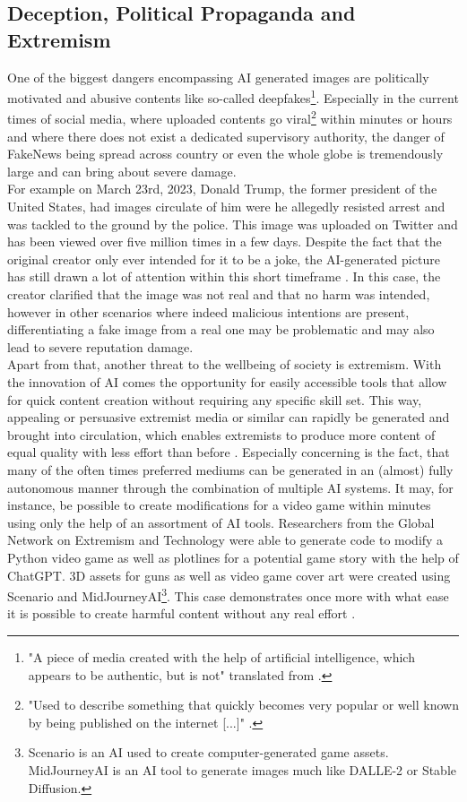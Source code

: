 \documentclass[10pt,twocolumn,twoside]{osajnl}
\begin{document}
\subsection{Deception, Political Propaganda and Extremism}
One of the biggest dangers encompassing AI generated images are politically motivated and abusive contents like so-called deepfakes\footnote[1]{"A piece of media created with the help of artificial intelligence, which appears to be authentic, but is not" translated from \cite{gabler}.}. 
Especially in the current times of social media, where uploaded contents go viral\footnote[2]{"Used to describe something that quickly becomes very popular or well known by being published on the internet [...]" \cite{viral}.} 
within minutes or hours and where there does not exist a dedicated supervisory authority, the danger of FakeNews being spread across country or even the whole globe is tremendously large and can bring about severe damage. \\ 
For example on March 23rd, 2023, Donald Trump, the former president of the United States, had images circulate of him 
were he allegedly resisted arrest and was tackled to the ground by the police. This image was uploaded on Twitter and has been viewed over five million times in a few days. Despite the fact that the original creator 
only ever intended for it to be a joke, the AI-generated picture has still drawn a lot of attention within this short timeframe \cite{trump}. In this case, the creator clarified that the image 
was not real and that no harm was intended, however in other scenarios where indeed malicious intentions are present, differentiating a fake image from a real one may be problematic and may also lead to severe reputation damage.
\\
Apart from that, another threat to the wellbeing of society is extremism. With the innovation of AI comes the opportunity for easily accessible tools that allow
for quick content creation without requiring any specific skill set. This way, appealing or persuasive extremist media or similar can rapidly be generated
and brought into circulation, which enables extremists to produce more content of equal quality with less effort than before \cite{AIPropaganda}.
Especially concerning is the fact, that many of the often times preferred mediums can be generated in an (almost) fully autonomous manner through the combination of multiple AI systems.
It may, for instance, be possible to create modifications for a video game within minutes using only the help of an assortment of AI tools.
Researchers from the Global Network on Extremism and Technology were able to generate code to modify a Python video game as well as plotlines for a potential game story with the help of ChatGPT. 
3D assets for guns as well as video game cover art were created using Scenario and MidJourneyAI\footnote[4]{Scenario is an AI used to create computer-generated game assets. MidJourneyAI
is an AI tool to generate images much like DALLE-2 or Stable Diffusion.}. This case demonstrates once more with what ease it is possible to create harmful content without any real effort \cite{AIPropaganda}. 
\end{document}
